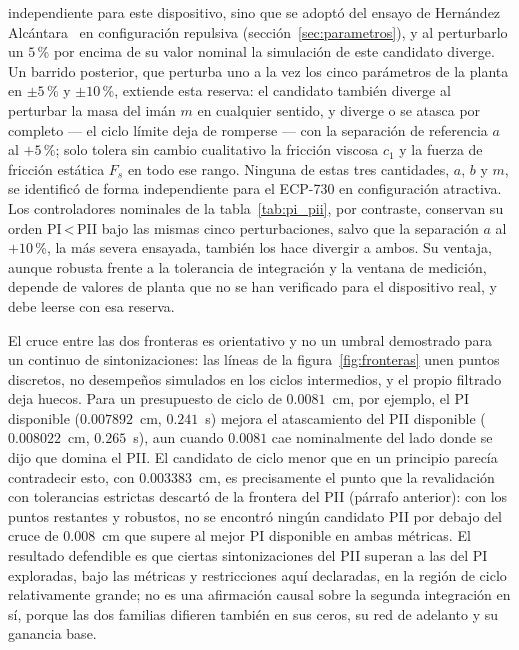 independiente para este dispositivo, sino que se adoptó del ensayo de Hernández Alcántara~\cite{diana_tesis} en configuración repulsiva (sección~\ref{sec:parametros}), y al perturbarlo un $5$\,\% por encima de su valor nominal la simulación de este candidato diverge. Un barrido posterior, que perturba uno a la vez los cinco parámetros de la planta en $\pm5$\,\% y $\pm10$\,\%, extiende esta reserva: el candidato también diverge al perturbar la masa del imán $m$ en cualquier sentido, y diverge o se atasca por completo --- el ciclo límite deja de romperse --- con la separación de referencia $a$ al $+5$\,\%; solo tolera sin cambio cualitativo la fricción viscosa $c_1$ y la fuerza de fricción estática $F_s$ en todo ese rango. Ninguna de estas tres cantidades, $a$, $b$ y $m$, se identificó de forma independiente para el ECP-730 en configuración atractiva. Los controladores nominales de la tabla~\ref{tab:pi_pii}, por contraste, conservan su orden PI\,<\,PII bajo las mismas cinco perturbaciones, salvo que la separación $a$ al $+10$\,\%, la más severa ensayada, también los hace divergir a ambos. Su ventaja, aunque robusta frente a la tolerancia de integración y la ventana de medición, depende de valores de planta que no se han verificado para el dispositivo real, y debe leerse con esa reserva.

El cruce entre las dos fronteras es orientativo y no un umbral demostrado para un continuo de sintonizaciones: las líneas de la figura~\ref{fig:fronteras} unen puntos discretos, no desempeños simulados en los ciclos intermedios, y el propio filtrado deja huecos. Para un presupuesto de ciclo de $0.0081$~cm, por ejemplo, el PI disponible ($0.007892$~cm, $0.241$~s) mejora el atascamiento del PII disponible ($0.008022$~cm, $0.265$~s), aun cuando $0.0081$ cae nominalmente del lado donde se dijo que domina el PII. El candidato de ciclo menor que en un principio parecía contradecir esto, con $0.003383$~cm, es precisamente el punto que la revalidación con tolerancias estrictas descartó de la frontera del PII (párrafo anterior): con los puntos restantes y robustos, no se encontró ningún candidato PII por debajo del cruce de $0.008$~cm que supere al mejor PI disponible en ambas métricas. El resultado defendible es que ciertas sintonizaciones del PII superan a las del PI exploradas, bajo las métricas y restricciones aquí declaradas, en la región de ciclo relativamente grande; no es una afirmación causal sobre la segunda integración en sí, porque las dos familias difieren también en sus ceros, su red de adelanto y su ganancia base.

